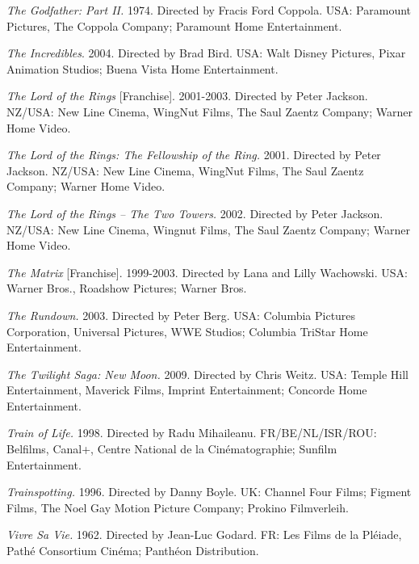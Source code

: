 \medskip\noindent\textit{The Godfather: Part II.} 1974. Directed by Fracis Ford Coppola. USA: Paramount Pictures, The Coppola Company; Paramount Home Entertainment.



\medskip\noindent\textit{The Incredibles}. 2004. Directed by Brad Bird. USA: Walt Disney Pictures, Pixar Animation Studios; Buena Vista Home Entertainment.



\medskip\noindent\textit{The Lord of the Rings} [Franchise]. 2001-2003. Directed by Peter Jackson. NZ/USA: New Line Cinema, WingNut Films, The Saul Zaentz Company; Warner Home Video.



\medskip\noindent\textit{The Lord of the Rings: The Fellowship of the Ring.} 2001. Directed by Peter Jackson. NZ/USA: New Line Cinema, WingNut Films, The Saul Zaentz Company; Warner Home Video.



\medskip\noindent\textit{The Lord of the Rings – The Two Towers.} 2002. Directed by Peter Jackson. NZ/USA: New Line Cinema, Wingnut Films, The Saul Zaentz Company; Warner Home Video.



\medskip\noindent\textit{The Matrix} [Franchise]. 1999-2003. Directed by Lana and Lilly Wachowski. USA: Warner Bros., Roadshow Pictures; Warner Bros.



\medskip\noindent\textit{The Rundown.} 2003. Directed by Peter Berg. USA: Columbia Pictures Corporation, Universal Pictures, WWE Studios; Columbia TriStar Home Entertainment.



\medskip\noindent\textit{The Twilight Saga: New Moon.} 2009. Directed by Chris Weitz. USA: Temple Hill Entertainment, Maverick Films, Imprint Entertainment; Concorde Home Entertainment.



\medskip\noindent\textit{Train of Life.} 1998. Directed by Radu Mihaileanu. FR/BE/NL/ISR/ROU: Belfilms, Canal+, Centre National de la Cinématographie; Sunfilm Entertainment.



\medskip\noindent\textit{Trainspotting.} 1996. Directed by Danny Boyle. UK: Channel Four Films; Figment Films, The Noel Gay Motion Picture Company; Prokino Filmverleih.  

\medskip\noindent\textit{Vivre Sa Vie.} 1962. Directed by Jean-Luc Godard. FR: Les Films de la Pléiade, Pathé Consortium Cinéma; Panthéon Distribution.
